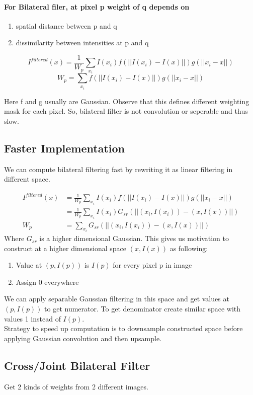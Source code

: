 \documentclass[a4paper]{article}
\begin{document}
\paragraph{\textnormal{For Bilateral filer, at pixel p weight of q depends on}}
\begin{enumerate}
\item spatial distance between p and q
\item dissimilarity between intensities at p and q
\end{enumerate} 

$$I^{filtered}(x) = \frac{1}{W_p}\sum_{x_i} I(x_i)f(||I(x_i)-I(x)||)g(||x_i-x||)$$
$$W_p = \sum_{x_i}f(||I(x_i)-I(x)||)g(||x_i-x||)$$

Here f and g usually are Gaussian. Observe that this defines different weighting mask for each pixel. So, bilateral filter is not convolution or seperable and thus slow.

\subsection{Faster Implementation}
We can compute bilateral filtering fast by rewriting it as linear filtering in different space.

\begin{align*}
I^{filtered}(x) &= \frac{1}{W_p}\sum_{x_i} I(x_i)f(||I(x_i)-I(x)||)g(||x_i-x||)\\
 &= \frac{1}{W_p}\sum_{x_i} I(x_i)G_{sr}(||(x_i,I(x_i))-(x,I(x))||)\\
W_p &= \sum_{x_i}G_{sr}(||(x_i,I(x_i))-(x,I(x))||)
\end{align*}
Where $G_{sr}$ is a higher dimensional Gaussian. This gives us motivation to construct at a higher dimensional space $(x,I(x))$ as following:
\begin{enumerate}
\item Value at $(p,I(p))$ is $I(p)$ for every pixel p in image
\item Assign 0 everywhere
\end{enumerate} 
We can apply separable Gaussian filtering in this space and get values at $(p,I(p))$ to get numerator. To get denominator create similar space with values 1 instead of $I(p)$.
\medskip
\\Strategy to speed up computation is to downsample constructed space before applying Gaussian convolution and then upsample. 

\subsection{Cross/Joint Bilateral Filter}
Get 2 kinds of weights from 2 different images.
\end{document}
